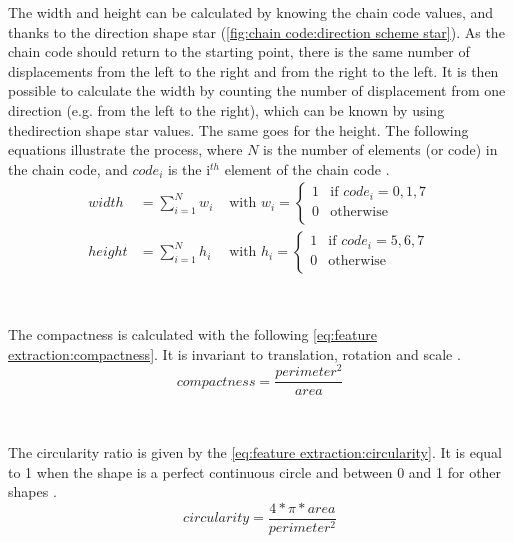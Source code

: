The width and height can be calculated by knowing the chain code values, and thanks to the direction shape star (\vref{fig:chain code:direction scheme star}). As the chain code should return to the starting point, there is the same number of displacements from the left to the right and from the right to the left. It is then possible to calculate the width by counting the number of displacement from one direction (e.g. from the left to the right), which can be known by using thedirection shape star values. The same goes for the height. The following equations illustrate the process, where $N$ is the number of elements (or code) in the chain code, and $code_i$ is the i$^{th}$ element of the chain code \cite{bib:chain:ShapeDescription}.
\begin{align}
width &= \sum_{i = 1}^{N} w_i 
& \text{ with } w_i = 
	\begin{cases}
		1 & \text{if } code_i = 0, 1, 7 \\
		0 & \text{otherwise} \\
	\end{cases} \\
height &= \sum_{i = 1}^{N} h_i 
& \text{ with }  h_i = 
	\begin{cases}
		1 & \text{if } code_i = 5, 6, 7 \\
		0 & \text{otherwise} \\
	\end{cases} 
\end{align}


~~

The compactness is calculated with the following \vref{eq:feature extraction:compactness}. It is invariant to translation, rotation and scale  \cite{bib:chain:RepresentationAndDescription}.
\begin{equation} \label{eq:feature extraction:compactness}
compactness = \frac{perimeter^2}{area}
\end{equation}

~~

The circularity ratio is given by the \vref{eq:feature extraction:circularity}. It is equal to 1 when the shape is a perfect continuous circle and between 0 and 1 for other shapes \cite{bib:chain:ObjectDescription}.
\begin{equation} \label{eq:feature extraction:circularity}
circularity = \frac{4 * \pi * area}{perimeter^2}
\end{equation}

